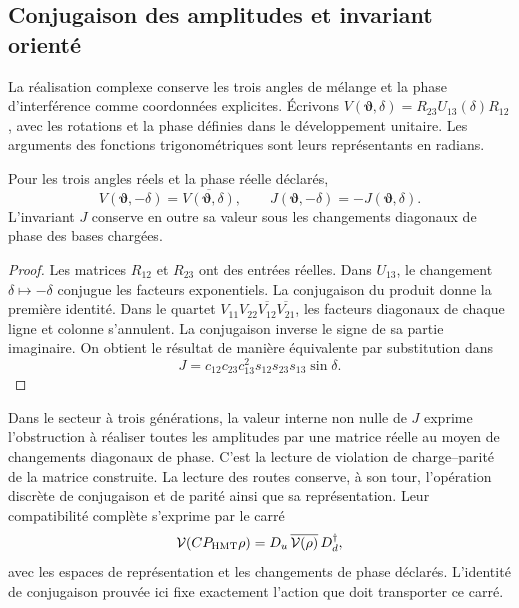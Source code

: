 \subsection{Conjugaison des amplitudes et invariant orienté}
\label{sec:ii09-conjugacion-amplitudes}

La réalisation complexe conserve les trois angles de mélange et
la phase d'interférence comme coordonnées explicites. Écrivons
\(V(\boldsymbol\vartheta,\delta)
=R_{23}U_{13}(\delta)R_{12}\), avec les rotations et la phase
définies dans le développement unitaire. Les arguments des
fonctions trigonométriques sont leurs représentants en radians.

\begin{proposition}
\label{prop:ii09-conjugacion-unitaria}
Pour les trois angles réels et la phase réelle déclarés,
\[
 V(\boldsymbol\vartheta,-\delta)
       =\overline{V(\boldsymbol\vartheta,\delta)},
 \qquad
 J(\boldsymbol\vartheta,-\delta)
       =-J(\boldsymbol\vartheta,\delta).
\]
L'invariant \(J\) conserve en outre sa valeur sous les changements
diagonaux de phase des bases chargées.
\end{proposition}
\begin{proof}
Les matrices \(R_{12}\) et \(R_{23}\) ont des entrées réelles.
Dans \(U_{13}\), le changement \(\delta\mapsto-\delta\) conjugue
les facteurs exponentiels. La conjugaison du produit donne la
première identité. Dans le quartet
\(V_{11}V_{22}\overline{V_{12}}\overline{V_{21}}\), les
facteurs diagonaux de chaque ligne et colonne s'annulent. La
conjugaison inverse le signe de sa partie imaginaire. On obtient
le résultat de manière équivalente par substitution dans
\[
 J=c_{12}c_{23}c_{13}^{2}s_{12}s_{23}s_{13}\sin\delta.
\]
\end{proof}

Dans le secteur à trois générations, la valeur interne non nulle de
\(J\) exprime l'obstruction à réaliser toutes les amplitudes
par une matrice réelle au moyen de changements diagonaux de phase. C'est
la lecture de violation de charge--parité de la matrice
construite. La lecture des routes conserve, à son tour, l'opération
discrète de conjugaison et de parité ainsi que sa représentation. Leur
compatibilité complète s'exprime par le carré
\[
 \mathcal V(CP_{\rm HMT}\rho)
  =D_u\,\overline{\mathcal V(\rho)}\,D_d^{\dagger},
\]
avec les espaces de représentation et les changements de phase
déclarés. L'identité de conjugaison prouvée ici fixe
exactement l'action que doit transporter ce carré.
